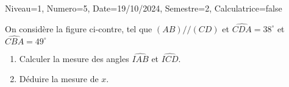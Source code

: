 \documentclass[a4paper,12pt]{article}
\begin{document}
\begin{Maquette}[DS]{Niveau=1, Numero=5, Date=19/10/2024, Semestre=2, Calculatrice=false}
\begin{exercice}
\begin{minipage}{.5\linewidth}
On considère la figure ci-contre, tel que $(AB)//(CD)$ et $\widehat{CDA}=38^{\circ}$ et $\widehat{CBA}=49^{\circ}$
\begin{enumerate}
\item{} Calculer la mesure des angles $\widehat{IAB}$ et $\widehat{ICD}$.\newline
\anserline[2]
\item{} Déduire la mesure de $x$.\newline
\anserline[2]
\end{enumerate}
\end{minipage}%
\begin{minipage}{.5\linewidth}
\end{minipage}

\end{exercice}
\end{Maquette}
\end{document}
